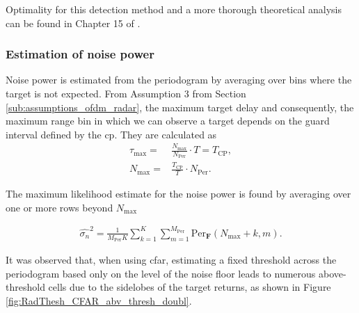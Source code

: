 				Optimality for this detection method and a more thorough theoretical analysis can be found in Chapter 15 of \cite{Richards_Scheer_Holm_2010}.

				\subsubsection{Estimation of noise power}
	
					Noise power is estimated from the periodogram by averaging over bins where the target is not expected.
					From Assumption 3 from Section \ref{sub:assumptions_ofdm_radar}, the maximum target delay and consequently, the maximum range bin in which we can observe a target depends on the guard interval defined by the \gls{cp}. They are calculated as 
					\begin{align}
						\tau_{\text{max}} =& \frac{N_{\text{max}}}{N_{\text{Per}}}\cdot T = T_\text{CP} ,\\
						N_{\text{max}} =& \frac{T_\text{CP}}{T}\cdot N_{\text{Per}}.
					\end{align} 
					
					The maximum likelihood estimate for the noise power is found by averaging over one or more rows beyond $N_{\text{max}}$
			
					\begin{align}
					\label{align: threshold_noise_power}
						\hat{\sigma_n}^2 = \frac{1}{M_{\text{Per}}K} \sum_{k=1}^K \sum_{m=1}^{M_{\text{Per}}} \text{Per}_{\bm{F}}(N_{\text{max}}+k, m).
					\end{align}
			
			It was observed that, when using \gls{cfar}, estimating a fixed threshold across the periodogram based only on the level of the noise floor leads to  numerous above-threshold cells due to the sidelobes of the target returns, as shown in Figure \ref{fig:RadThesh_CFAR_abv_thresh_doubl}.
			
